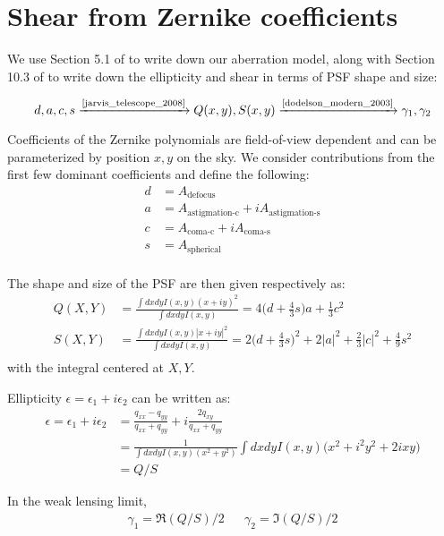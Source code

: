 \section{Shear from Zernike coefficients} \label{sec:ell_zernike} 

We use Section 5.1 of \cite{jarvis_telescope_2008} to write down our aberration model, along with Section 10.3 of \cite{dodelson_modern_2003} to write down the ellipticity and shear in terms of PSF shape and size: 

\begin{equation}
d, a, c, s \xrightarrow{\text{\cite{jarvis_telescope_2008}}} Q(x, y), S(x, y) \xrightarrow{\text{\cite{dodelson_modern_2003}}} \gamma_1, \gamma_2
\end{equation}

Coefficients of the Zernike polynomials are field-of-view dependent and can be parameterized by position $x, y$ on the sky. We consider contributions from the first few dominant coefficients and define the following:
\begin{align}
d &= A_\text{defocus} \\
a &= A_\text{astigmation-c} + i A_\text{astigmation-s} \\
c &= A_\text{coma-c} + i A_\text{coma-s} \\
s &= A_\text{spherical} \\
\end{align}

The shape and size of the PSF are then given respectively as:
\begin{align}
Q(X, Y) &= \frac{\int dx dy I(x, y) (x+iy)^2}{\int dx dy I(x, y)} = 4 \Big(d+\frac{4}{3}s \Big) a + \frac{1}{3} c^2\\
S(X, Y) &= \frac{\int dx dy I(x, y) |x+iy|^2}{\int dx dy I(x, y)} = 2 \Big(d+\frac{4}{3}s \Big)^2 + 2 |a|^2 + \frac{2}{3} |c|^2 + \frac{4}{9} s^2\\
\end{align}
with the integral centered at $X, Y$. 

Ellipticity $\epsilon = \epsilon_1 + i \epsilon_2$ can be written as:
\begin{align}
\epsilon = \epsilon_1 + i \epsilon_2 &= \frac{q_{xx} - q_{yy}}{q_{xx} + q_{yy}} + i \frac{2 q_{xy}}{q_{xx} + q_{yy}}\\
&= \frac{1}{\int dx dy I(x, y) (x^2 + y^2)} \int dx dy I(x, y) \Big( x^2 + i^2 y^2 + 2ixy \Big) \\
&= Q \Big/ S
\end{align}

In the weak lensing limit, 
\begin{align}
\gamma_1 = \Re(Q / S) \Big/ 2 && \gamma_2 = \Im(Q / S) \Big/ 2
\end{align}